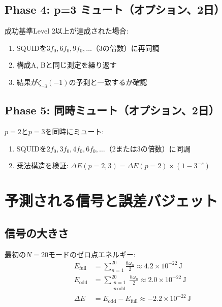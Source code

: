 \documentclass[12pt,a4paper]{article}
\begin{document}
\subsection{Phase 4: p=3 ミュート（オプション、2日）}

成功基準Level 2以上が達成された場合:
\begin{enumerate}
\item SQUIDを$3f_0, 6f_0, 9f_0, \ldots$（3の倍数）に再同調
\item 構成A, Bと同じ測定を繰り返す
\item 結果が$\zeta_{\neg 3}(-1)$の予測と一致するか確認
\end{enumerate}

\subsection{Phase 5: 同時ミュート（オプション、2日）}

$p=2$と$p=3$を同時にミュート:
\begin{enumerate}
\item SQUIDを$2f_0, 3f_0, 4f_0, 6f_0, \ldots$（2または3の倍数）に同調
\item 乗法構造を検証: $\Delta E(p=2,3) = \Delta E(p=2) \times (1-3^{-s})$
\end{enumerate}

\section{予測される信号と誤差バジェット}

\subsection{信号の大きさ}

最初の$N = 20$モードのゼロ点エネルギー:
\begin{align}
  E_{\mathrm{full}} &= \sum_{n=1}^{20} \frac{\hbar\omega_n}{2} \approx 4.2 \times 10^{-22}\,\text{J} \\
  E_{\mathrm{odd}} &= \sum_{\substack{n=1\\n\,\text{odd}}}^{20} \frac{\hbar\omega_n}{2} \approx 2.0 \times 10^{-22}\,\text{J} \\
  \Delta E &= E_{\mathrm{odd}} - E_{\mathrm{full}} \approx -2.2 \times 10^{-22}\,\text{J}
\end{align}
\end{document}
